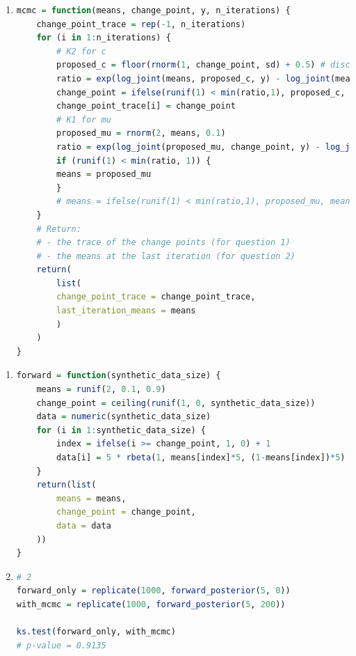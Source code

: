 \documentclass{article}
\begin{document}
\begin{enumerate}
\item 
\begin{lstlisting}[language=R]
mcmc = function(means, change_point, y, n_iterations) {
    change_point_trace = rep(-1, n_iterations)
    for (i in 1:n_iterations) {
        # K2 for c
        proposed_c = floor(rnorm(1, change_point, sd) + 0.5) # discrete normal proposal
        ratio = exp(log_joint(means, proposed_c, y) - log_joint(means, change_point, y)) # M-H ratio
        change_point = ifelse(runif(1) < min(ratio,1), proposed_c, change_point) # acceptance
        change_point_trace[i] = change_point
        # K1 for mu
        proposed_mu = rnorm(2, means, 0.1)
        ratio = exp(log_joint(proposed_mu, change_point, y) - log_joint(means, change_point, y))
        if (runif(1) < min(ratio, 1)) {
        means = proposed_mu
        }
        # means = ifelse(runif(1) < min(ratio,1), proposed_mu, means) # !!! VERY ANNOYING BUG
    }
    # Return:
    # - the trace of the change points (for question 1) 
    # - the means at the last iteration (for question 2)
    return(
        list(
        change_point_trace = change_point_trace, 
        last_iteration_means = means 
        )
    )
}
\end{lstlisting}



\end{enumerate}



\begin{enumerate}
\item 
\begin{lstlisting}[language=R]
forward = function(synthetic_data_size) {
    means = runif(2, 0.1, 0.9)
    change_point = ceiling(runif(1, 0, synthetic_data_size))
    data = numeric(synthetic_data_size)
    for (i in 1:synthetic_data_size) {
        index = ifelse(i >= change_point, 1, 0) + 1
        data[i] = 5 * rbeta(1, means[index]*5, (1-means[index])*5)
    } 
    return(list(
        means = means,
        change_point = change_point,
        data = data
    ))
}
\end{lstlisting}


\item 
\begin{lstlisting}[language=R]
# 2
forward_only = replicate(1000, forward_posterior(5, 0))
with_mcmc = replicate(1000, forward_posterior(5, 200))

ks.test(forward_only, with_mcmc)
# p-value = 0.9135
\end{lstlisting}
\end{enumerate}
\end{document}
